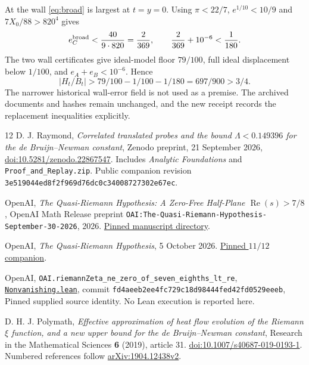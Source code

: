 \documentclass[11pt,a4paper]{article}
\theoremstyle{definition}\newtheorem{definition}[theorem]{Definition}
\theoremstyle{remark}\newtheorem{remark}[theorem]{Remark}
\newcommand{\Rea}{\operatorname{Re}}
\begin{document}
At the wall \eqref{eq:broad} is largest at $t=y=0$. Using
$\pi<22/7$, $e^{1/10}<10/9$ and $7X_0/88>820^4$ gives
\[
e_C^{\rm broad}<\frac{40}{9\cdot820}=\frac2{369},
\qquad\frac2{369}+10^{-6}<\frac1{180}.
\]
The two wall certificates give ideal-model floor $79/100$, full ideal
displacement below $1/100$, and $e_A+e_B<10^{-6}$. Hence
\[
|H_t/B_t|>79/100-1/100-1/180=697/900>3/4.
\]
The narrower historical wall-error field is not used as a premise. The
archived documents and hashes remain unchanged, and the new receipt records
the replacement inequalities explicitly.

\begin{thebibliography}{12}
\setlength{\itemsep}{4pt}
 D. J. Raymond,
\emph{Correlated translated probes and the bound $\Lambda<0.149396$ for
the de Bruijn--Newman constant}, Zenodo preprint, 21 September 2026,
\href{https://doi.org/10.5281/zenodo.22867547}{doi:10.5281/zenodo.22867547}.
Includes \emph{Analytic Foundations} and \nolinkurl{Proof_and_Replay.zip}.
Public companion revision
\nolinkurl{3e519044ed8f2f969d76dc0c34008727302e67ec}.

 OpenAI,
\emph{The Quasi-Riemann Hypothesis: A Zero-Free Half-Plane
$\Rea(s)>7/8$}, OpenAI Math Release preprint
\texttt{OAI:The-Quasi-Riemann-Hypothesis-September-30-2026}, 2026.
\href{https://github.com/openai/math/tree/fd4aeeb2ee4fc729c18d98444fed42fd0529eeeb/preprints/The-Quasi-Riemann-Hypothesis-September-30-2026}{Pinned manuscript directory}.

 OpenAI,
\emph{The Quasi-Riemann Hypothesis}, 5 October 2026.
\href{https://github.com/openai/math/tree/fd4aeeb2ee4fc729c18d98444fed42fd0529eeeb/preprints/The-Quasi-Riemann-Hypothesis-October-5-2026}{Pinned $11/12$ companion}.

 OpenAI,
\nolinkurl{OAI.riemannZeta_ne_zero_of_seven_eighths_lt_re},
\href{https://github.com/openai/math/blob/fd4aeeb2ee4fc729c18d98444fed42fd0529eeeb/lean/OAI/NumberTheory/DirichletL/Nonvanishing.lean}{\texttt{Nonvanishing.lean}},
commit \nolinkurl{fd4aeeb2ee4fc729c18d98444fed42fd0529eeeb},
Pinned supplied source identity. No Lean execution is reported here.

 D. H. J. Polymath,
\emph{Effective approximation of heat flow evolution of the Riemann
$\xi$ function, and a new upper bound for the de Bruijn--Newman constant},
Research in the Mathematical Sciences \textbf{6} (2019), article 31.
\href{https://doi.org/10.1007/s40687-019-0193-1}{doi:10.1007/s40687-019-0193-1}.
Numbered references follow \href{https://arxiv.org/abs/1904.12438v2}{arXiv:1904.12438v2}.


\end{thebibliography}
\end{document}
